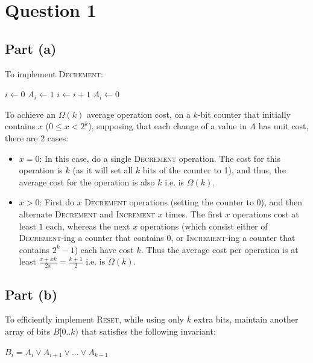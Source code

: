 \documentclass[a4paper,11pt]{scrartcl}
\begin{document}
\newcommand{\operation}[2]{\textsc{#1}($#2$)}

\section{Question 1}
\subsection{Part (a)}
To implement \textsc{Decrement}:

\begin{algorithmic}[1]

    \State $i \gets 0$
        \State $A_i \gets 1$
        \State $i \gets i+1$
    \EndWhile
        \State $A_i \gets 0$
    \EndIf
\EndFunction

\end{algorithmic}

To achieve an $\Omega(k)$ average operation cost, on a $k$-bit counter that initially contains $x$ ($0 \leq x < 2^k$), supposing that each change of a value in $A$ has unit cost, there are 2 cases:

\begin{itemize}
    \item $x = 0$: In this case, do a single \textsc{Decrement} operation. The cost for this operation is $k$ (as it will set all $k$ bits of the counter to 1), and thus, the average cost for the operation is also $k$ i.e. is $\Omega(k)$.
    \item $x > 0$: First do $x$ \textsc{Decrement} operations (setting the counter to $0$), and then alternate \textsc{Decrement} and \textsc{Increment} $x$ times. The first $x$ operations cost at least $1$ each, whereas the next $x$ operations (which consist either of \textsc{Decrement}-ing a counter that contains $0$, or \textsc{Increment}-ing a counter that contains $2^k-1$) each have cost $k$. Thus the average cost per operation is at least $\frac{x + x k}{2 x} = \frac{k + 1}{2}$ i.e. is $\Omega(k)$.
\end{itemize}

\subsection{Part (b)}
To efficiently implement \textsc{Reset}, while using only $k$ extra bits, maintain another array of bits $B[0..k)$ that satisfies the following invariant:
\begin{center}
    $B_i = A_i \lor A_{i+1} \lor ... \lor A_{k-1}$
\end{center}
\end{document}
